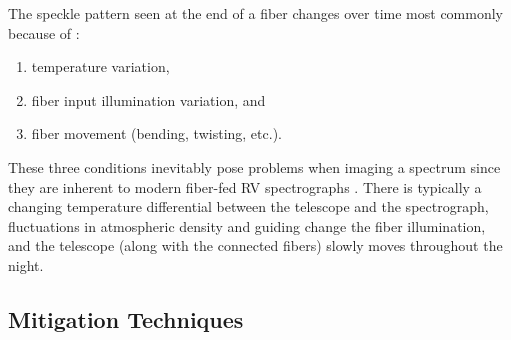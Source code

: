 The speckle pattern seen at the end of a fiber changes over time most commonly because of \citep{epworth_phenomenon_1978}:
\begin{enumerate}
\item temperature variation,
\item fiber input illumination variation, and
\item fiber movement (bending, twisting, etc.).
\end{enumerate}
These three conditions inevitably pose problems when imaging a spectrum since they are inherent to modern fiber-fed RV spectrographs \citep{baudrand_modal_2001, mahadevan_suppression_2014}. There is typically a changing temperature differential between the telescope and the spectrograph, fluctuations in atmospheric density and guiding change the fiber illumination, and the telescope (along with the connected fibers) slowly moves throughout the night.

\subsection{Mitigation Techniques}
\label{subsec:mitigation}

